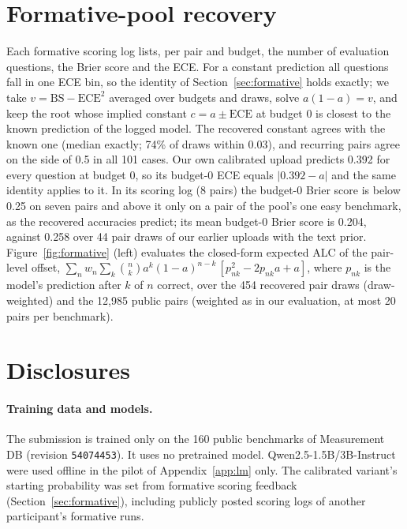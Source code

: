 \documentclass{article}
\newcommand{\code}[1]{\texttt{#1}}
\begin{document}
\section{Formative-pool recovery}
\label{app:formative}
Each formative scoring log lists, per pair and budget, the number of evaluation questions, the Brier score and the ECE. For a constant prediction all questions fall in one ECE bin, so the identity of Section~\ref{sec:formative} holds exactly; we take $v = \mathrm{BS} - \mathrm{ECE}^2$ averaged over budgets and draws, solve $a(1-a) = v$, and keep the root whose implied constant $c = a \pm \mathrm{ECE}$ at budget 0 is closest to the known prediction of the logged model. The recovered constant agrees with the known one (median exactly; 74\% of draws within 0.03), and recurring pairs agree on the side of 0.5 in all 101 cases. Our own calibrated upload predicts 0.392 for every question at budget 0, so its budget-0 ECE equals $|0.392 - a|$ and the same identity applies to it. In its scoring log (8 pairs) the budget-0 Brier score is below 0.25 on seven pairs and above it only on a pair of the pool's one easy benchmark, as the recovered accuracies predict; its mean budget-0 Brier score is 0.204, against 0.258 over 44 pair draws of our earlier uploads with the text prior. Figure~\ref{fig:formative} (left) evaluates the closed-form expected ALC of the pair-level offset, $\sum_n w_n \sum_k \binom{n}{k} a^k (1-a)^{n-k}\,[p_{nk}^2 - 2 p_{nk} a + a]$, where $p_{nk}$ is the model's prediction after $k$ of $n$ correct, over the 454 recovered pair draws (draw-weighted) and the 12{,}985 public pairs (weighted as in our evaluation, at most 20 pairs per benchmark).

\section{Disclosures}
\label{app:disclosure}

\paragraph{Training data and models.} The submission is trained only on the 160 public benchmarks of Measurement DB (revision \code{54074453}). It uses no pretrained model. Qwen2.5-1.5B/3B-Instruct were used offline in the pilot of Appendix~\ref{app:lm} only. The calibrated variant's starting probability was set from formative scoring feedback (Section~\ref{sec:formative}), including publicly posted scoring logs of another participant's formative runs.
\end{document}

